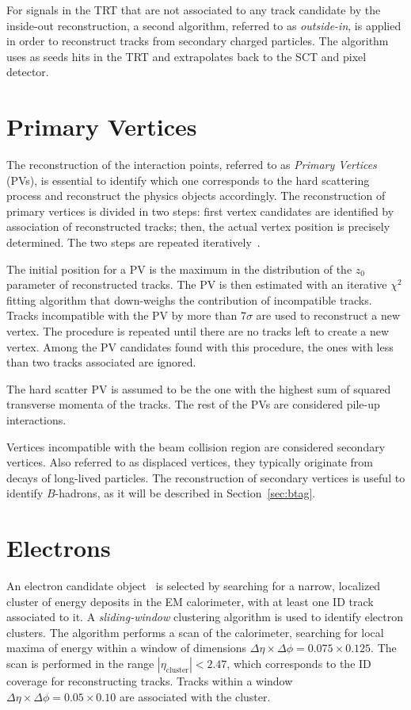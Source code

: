For signals in the TRT that are not associated to any track candidate
by the inside-out reconstruction, a second algorithm,
referred to as {\it outside-in}, is applied in order to
reconstruct tracks from secondary charged particles. 
The algorithm uses as seeds hits in the TRT
and extrapolates back to the SCT and pixel detector.


\section{Primary Vertices}
\label{sec:pv}

The reconstruction of the interaction points, referred to as {\it Primary
  Vertices} (PVs), is essential to identify which one corresponds to
the hard scattering process and reconstruct the physics
objects accordingly. The reconstruction of primary vertices is divided
in two steps: first vertex candidates are identified by association
of reconstructed tracks; then, the actual vertex position is precisely
determined. The two steps are repeated iteratively~\cite{vertexalgo}.

The initial position for a PV is the maximum in the distribution of
the $z_0$ parameter of reconstructed tracks. The PV is then
estimated with an iterative $\chi^2$ fitting algorithm that
down-weighs the contribution of incompatible tracks. Tracks
incompatible with the PV by more than 7$\sigma$ are used to
reconstruct a new vertex. The procedure is repeated until there are no
tracks left to create a new vertex. Among the PV candidates found with
this procedure, the ones with less than two tracks associated are ignored. 

The hard scatter PV is assumed to be the one with the highest sum of
squared transverse momenta of the tracks. The rest of the PVs are
considered pile-up interactions. 

Vertices incompatible with the beam collision region are considered
secondary vertices.
Also referred to as displaced vertices, they typically originate from
decays of long-lived particles.
The reconstruction of secondary vertices is useful to identify
$B$-hadrons, as it will be described in Section~\ref{sec:btag}.

\section{Electrons}
\label{sec:electrons}

An electron candidate object~\cite{elereco} is selected by searching 
for a narrow, 
localized cluster of energy deposits in the EM calorimeter, 
with at least one ID track associated to it.
A {\it sliding-window} clustering algorithm is used to identify electron 
clusters. The algorithm performs a scan of the calorimeter, searching 
for local maxima of energy within a window of dimensions
$\Delta\eta\times\Delta\phi=0.075\times{}0.125$. 
The scan is performed in the range $|\eta_{\mathrm{cluster}}|<2.47$, 
which corresponds to the ID coverage for reconstructing tracks. 
Tracks within a window $\Delta\eta\times\Delta\phi=0.05\times{}0.10$
are associated with the cluster.

